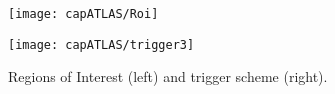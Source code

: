 
\begin{figure}[hbt]\begin{center}\begin{minipage}{.45\textwidth}
\texttt{[image: capATLAS/Roi]}
\end{minipage}\hspace{.05\textwidth}\begin{minipage}{.45\textwidth}
\texttt{[image: capATLAS/trigger3]}
\end{minipage}
\caption{Regions of Interest (left) and trigger scheme (right). }\label{trigger3}
\end{center}\end{figure}



